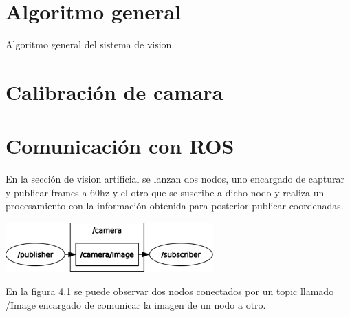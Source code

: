 \section{Algoritmo general}
\begin{algorithm}
    \caption{Algoritmo general del sistema de vision}
    \begin{algorithmic}[1]
    \end{algorithmic}
\end{algorithm}


\section{Calibración de camara}




\section{Comunicación con ROS}
En la sección de vision artificial se lanzan dos nodos, uno encargado de capturar y
publicar frames a 60hz y el otro que se suscribe a dicho nodo y realiza un procesamiento
con la información obtenida para posterior publicar coordenadas.
\begin{center}
    \includegraphics[width=0.6\textwidth]{Capitulo4/Fig0.eps}       
    \label{Fig1}
\end{center}
En la figura 4.1 se puede observar dos nodos conectados por un topic llamado /Image
encargado de comunicar la imagen de un nodo a otro.
